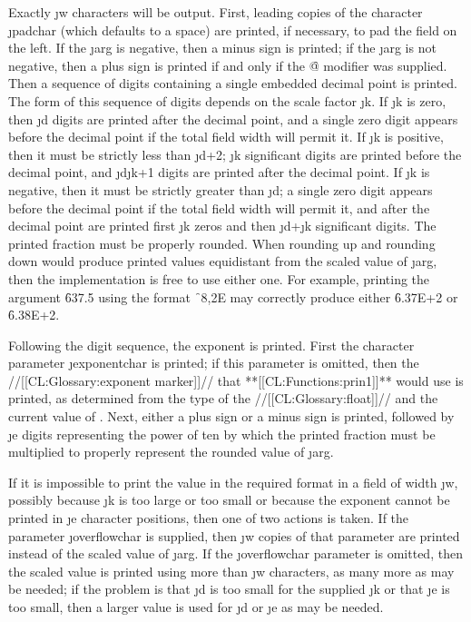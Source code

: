 Exactly \j{w} characters will be output.  First, leading copies of the character \j{padchar} (which defaults to a space) are printed, if necessary, to pad the field on the left. If the \j{arg} is negative, then a minus sign is printed; if the \j{arg} is not negative, then a plus sign is printed if and only if the \f{@} modifier was supplied.  Then a sequence of digits containing a single embedded decimal point is printed. The form of this sequence of digits depends on the scale factor \j{k}. If \j{k} is zero, then \j{d} digits are printed after the decimal point, and a single zero digit appears before the decimal point if the total field width will permit it.  If \j{k} is positive, then it must be strictly less than \j{d}+2;  \j{k} significant digits are printed before the decimal point, and \j{d}\minussign \j{k}+1 digits are printed after the decimal point.  If \j{k} is negative, then it must be strictly greater than \minussign \j{d}; a single zero digit appears before the decimal point if the total field width will permit it, and after the decimal point are printed first \minussign \j{k} zeros and then \j{d}+\j{k} significant digits. The printed fraction must be properly rounded.          When rounding up and rounding down would produce printed values equidistant from the scaled value of \j{arg}, then the implementation is free to use either one.  For example, printing the argument \f{637.5} using the format \f{~8,2E} may correctly produce either \f{6.37E+2} or \f{6.38E+2}.

Following the digit sequence, the exponent is printed. First the character parameter \j{exponentchar} is printed; if this parameter is omitted, then the //[[CL:Glossary:exponent marker]]// that **[[CL:Functions:prin1]]** would use is printed, as determined from the type of the //[[CL:Glossary:float]]// and the current value of . Next, either a plus sign or a minus sign is printed, followed by \j{e} digits representing the power of ten by which the printed fraction must be multiplied to properly represent the rounded value of \j{arg}.

If it is impossible to print the value in the required format in a field of width \j{w}, possibly because \j{k} is too large or too small or because the exponent cannot be printed in \j{e} character positions, then one of two actions is taken.  If the parameter \j{overflowchar} is supplied, then \j{w} copies of that parameter are printed instead of the scaled value of \j{arg}. If the \j{overflowchar} parameter is omitted, then the scaled value is printed using more than \j{w} characters, as many more as may be needed; if the problem is that \j{d} is too small for the supplied \j{k} or that \j{e} is too small, then a larger value is used for \j{d} or \j{e} as may be needed.

